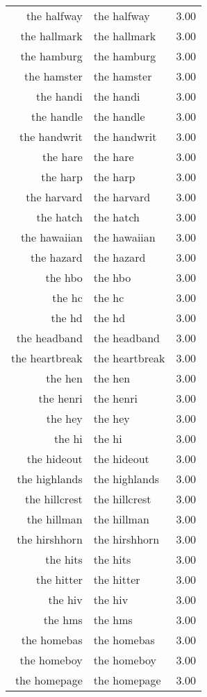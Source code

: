 \begin{table}[ht]
\begin{tabular}{rlr}
  the halfway & the halfway & 3.00 \\ 
  the hallmark & the hallmark & 3.00 \\ 
  the hamburg & the hamburg & 3.00 \\ 
  the hamster & the hamster & 3.00 \\ 
  the handi & the handi & 3.00 \\ 
  the handle & the handle & 3.00 \\ 
  the handwrit & the handwrit & 3.00 \\ 
  the hare & the hare & 3.00 \\ 
  the harp & the harp & 3.00 \\ 
  the harvard & the harvard & 3.00 \\ 
  the hatch & the hatch & 3.00 \\ 
  the hawaiian & the hawaiian & 3.00 \\ 
  the hazard & the hazard & 3.00 \\ 
  the hbo & the hbo & 3.00 \\ 
  the hc & the hc & 3.00 \\ 
  the hd & the hd & 3.00 \\ 
  the headband & the headband & 3.00 \\ 
  the heartbreak & the heartbreak & 3.00 \\ 
  the hen & the hen & 3.00 \\ 
  the henri & the henri & 3.00 \\ 
  the hey & the hey & 3.00 \\ 
  the hi & the hi & 3.00 \\ 
  the hideout & the hideout & 3.00 \\ 
  the highlands & the highlands & 3.00 \\ 
  the hillcrest & the hillcrest & 3.00 \\ 
  the hillman & the hillman & 3.00 \\ 
  the hirshhorn & the hirshhorn & 3.00 \\ 
  the hits & the hits & 3.00 \\ 
  the hitter & the hitter & 3.00 \\ 
  the hiv & the hiv & 3.00 \\ 
  the hms & the hms & 3.00 \\ 
  the homebas & the homebas & 3.00 \\ 
  the homeboy & the homeboy & 3.00 \\ 
  the homepage & the homepage & 3.00 \\ 

\end{tabular}
\end{table}
